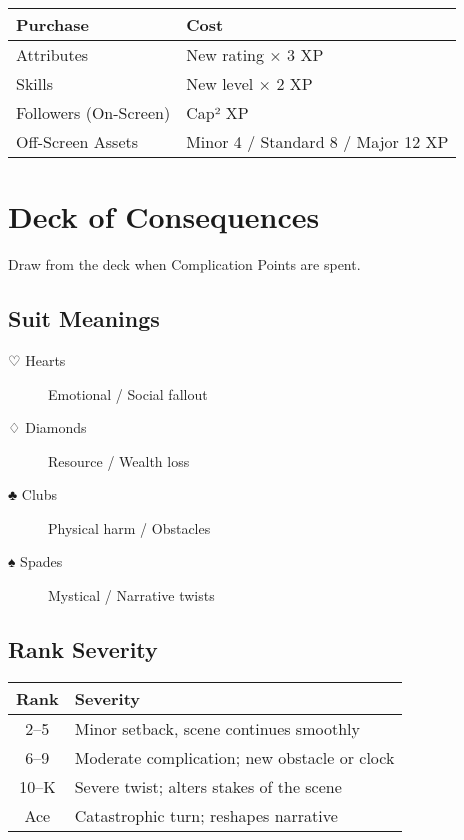 \begin{center}
\begin{tabular}{ll}
\toprule
\textbf{Purchase} & \textbf{Cost} \\
\midrule
Attributes & New rating × 3 XP \\
Skills & New level × 2 XP \\
Followers (On-Screen) & Cap² XP \\
Off-Screen Assets & Minor 4 / Standard 8 / Major 12 XP \\
\bottomrule
\end{tabular}
\end{center}

\section{Deck of Consequences}

Draw from the deck when Complication Points are spent.

\subsection*{Suit Meanings}
\begin{description}
  \item[♡ Hearts] Emotional / Social fallout
  \item[♢ Diamonds] Resource / Wealth loss
  \item[♣ Clubs] Physical harm / Obstacles
  \item[♠ Spades] Mystical / Narrative twists
\end{description}

\subsection*{Rank Severity}
\begin{center}
\begin{tabular}{cl}
\toprule
\textbf{Rank} & \textbf{Severity} \\
\midrule
2–5 & Minor setback, scene continues smoothly \\
6–9 & Moderate complication; new obstacle or clock \\
10–K & Severe twist; alters stakes of the scene \\
Ace & Catastrophic turn; reshapes narrative \\
\bottomrule
\end{tabular}
\end{center}

